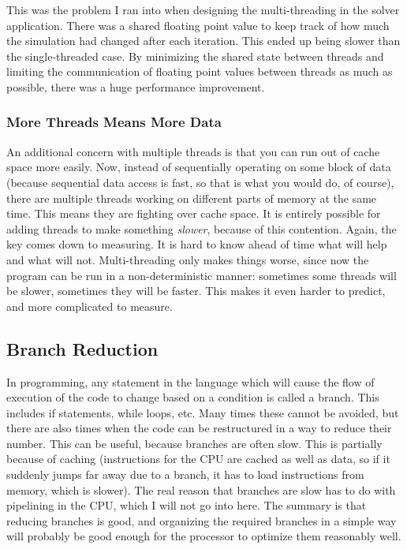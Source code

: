 This was the problem I ran into when designing the multi-threading in the solver application. There was a shared floating point value
to keep track of how much the simulation had changed after each iteration. This ended up being slower than the single-threaded case.
By minimizing the shared state between threads and limiting the communication of floating point values between threads as much as
possible, there was a huge performance improvement.

\subsubsection{More Threads Means More Data}

An additional concern with multiple threads is that you can run out of cache space more easily. Now, instead of sequentially operating
on some block of data (because sequential data access is fast, so that is what you would do, of course), there are multiple threads
working on different parts of memory at the same time. This means they are fighting over cache space. It is entirely possible for
adding threads to make something \textit{slower}, because of this contention. Again, the key comes down to measuring. It is hard to
know ahead of time what will help and what will not. Multi-threading only makes things worse, since now the program can be run in a
non-deterministic manner: sometimes some threads will be slower, sometimes they will be faster. This makes it even harder to predict,
and more complicated to measure.

\subsection{Branch Reduction}

In programming, any statement in the language which will cause the flow of execution of the code to change based on a condition
is called a branch. This includes if statements, while loops, etc. Many times these cannot be avoided, but there are also
times when the code can be restructured in a way to reduce their number. This can be useful, because branches are often slow.
This is partially because of caching (instructions for the CPU are cached as well as data, so if it suddenly jumps far away due
to a branch, it has to load instructions from memory, which is slower). The real reason that branches are slow has to do with
pipelining in the CPU, which I will not go into here. The summary is that reducing branches is good, and organizing the required
branches in a simple way will probably be good enough for the processor to optimize them reasonably well.

